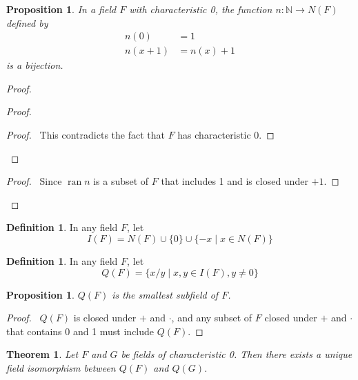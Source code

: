 \documentclass{book}
\let\qed\relax
\newtheorem{prop}[ax]{Proposition}
\newtheorem{thm}[ax]{Theorem}
\theoremstyle{definition}
\newtheorem{df}[ax]{Definition}
\newcommand{\ran}{\ensuremath{\operatorname{ran}}}
\begin{document}
\begin{prop}
\label{prop:NFbij}
In a field $F$ with characteristic 0, the function $n : \mathbb{N} \rightarrow N(F)$ defined by
\begin{align*}
n(0) & = 1 \\
n(x+1) & = n(x) + 1
\end{align*}
is a bijection.
\end{prop}

\begin{proof}
\pf
{}
\begin{proof}
	\qedstep
	\begin{proof}
		\pf\ This contradicts the fact that $F$ has characteristic 0.
	\end{proof}
\end{proof}
\begin{proof}
	\pf\ Since $\ran n$ is a subset of $F$ that includes 1 and is closed under $+1$.
\end{proof}
\qed
\end{proof}

\begin{df}
In any field $F$, let
\[ I(F) = N(F) \cup \{0\} \cup \{-x \mid x \in N(F) \} \]
\end{df}

\begin{df}
In any field $F$, let
\[ Q(F) = \{ x/y \mid x,y \in I(F), y \neq 0 \} \]
\end{df}

\begin{prop}
$Q(F)$ is the smallest subfield of $F$.
\end{prop}

\begin{proof}
\pf\ $Q(F)$ is closed under $+$ and $\cdot$, and any subset of $F$ closed under $+$ and $\cdot$ that contains 0 and 1 must include $Q(F)$. \qed
\end{proof}

\begin{thm}
\label{thm:Qisounique}
Let $F$ and $G$ be fields of characteristic 0. Then there exists a unique field isomorphism between $Q(F)$ and $Q(G)$.
\end{thm}
\end{document}
